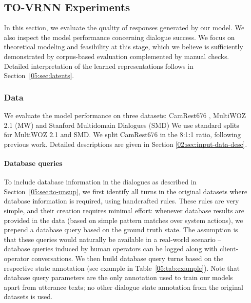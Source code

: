 \subsection{TO-VRNN Experiments}
In this section, we evaluate the quality of responses generated by our model.
We also inspect the model performance concerning dialogue success.
We focus on theoretical modeling and feasibility at this stage, which we believe is sufficiently demonstrated by corpus-based evaluation complemented by manual checks. Detailed interpretation of the learned representations follows in Section~\ref{05:sec:latents}.

\subsubsection{Data}
\label{05:sec:data}

We evaluate the model performance on three datasets: CamRest676 \cite{wen2016network}, MultiWOZ 2.1 (MW)\cite{budzianowski2018multiwoz,eric2019multiwoz} and Stanford Multidomain Dialogues (SMD) \cite{eric-etal-2017-key}
We use standard splits for MultiWOZ 2.1 and SMD.
We split CamRest676 in the 8:1:1 ratio, following previous work.
Detailed descriptions are given in Section \ref{02:sec:input-data-desc}.

\paragraph{Database queries} To include database information in the dialogues as described in Section~\ref{05:sec:to-unsup}, we first identify all turns in the original datasets where database information is required, using handcrafted rules.
These rules are very simple, and their creation requires minimal effort: whenever database results are provided in the data (based on simple pattern matches over system actions), we prepend a database query based on the ground truth state. The assumption is that these queries would naturally be available in a real-world scenario -- database queries induced by human operators can be logged along with client-operator conversations.
We then build database query turns based on the respective state annotation (see example in Table~\ref{05:tab:example}).
Note that database query parameters are the only annotation used to train our models apart from utterance texts; no other dialogue state annotation from the original datasets is used.

